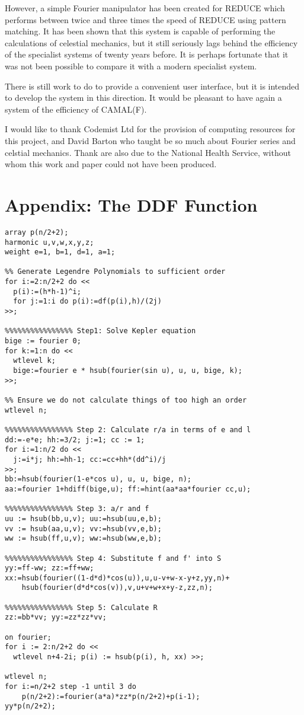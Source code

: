 However, a simple Fourier manipulator has been created for REDUCE which
performs between twice and three times the speed of REDUCE using
pattern matching.  It has been shown that this system is capable of
performing the calculations of celestial mechanics, but it still
seriously lags behind the efficiency of the specialist systems of
twenty years before.  It is perhaps fortunate that it was not been
possible to compare it with a modern specialist system.

There is still work to do to provide a convenient user interface, but
it is intended to develop the system in this direction.  It would be
pleasant to have again a system of the efficiency of CAMAL(F).

I would like to thank Codemist Ltd for the provision of computing
resources for this project, and David Barton who taught be so much
about Fourier series and celstial mechanics.  Thank are also due to
the National Health Service, without whom this work and paper could not
have been produced.

\section*{Appendix: The DDF Function}
\begin{verbatim}
array p(n/2+2);
harmonic u,v,w,x,y,z;
weight e=1, b=1, d=1, a=1;

%% Generate Legendre Polynomials to sufficient order
for i:=2:n/2+2 do <<
  p(i):=(h*h-1)^i;
  for j:=1:i do p(i):=df(p(i),h)/(2j)
>>;

%%%%%%%%%%%%%%%% Step1: Solve Kepler equation
bige := fourier 0;
for k:=1:n do <<
  wtlevel k;
  bige:=fourier e * hsub(fourier(sin u), u, u, bige, k);
>>;

%% Ensure we do not calculate things of too high an order
wtlevel n;

%%%%%%%%%%%%%%%% Step 2: Calculate r/a in terms of e and l
dd:=-e*e; hh:=3/2; j:=1; cc := 1;
for i:=1:n/2 do <<
  j:=i*j; hh:=hh-1; cc:=cc+hh*(dd^i)/j
>>;
bb:=hsub(fourier(1-e*cos u), u, u, bige, n);
aa:=fourier 1+hdiff(bige,u); ff:=hint(aa*aa*fourier cc,u);

%%%%%%%%%%%%%%%% Step 3: a/r and f
uu := hsub(bb,u,v); uu:=hsub(uu,e,b);
vv := hsub(aa,u,v); vv:=hsub(vv,e,b);
ww := hsub(ff,u,v); ww:=hsub(ww,e,b);

%%%%%%%%%%%%%%%% Step 4: Substitute f and f' into S
yy:=ff-ww; zz:=ff+ww;
xx:=hsub(fourier((1-d*d)*cos(u)),u,u-v+w-x-y+z,yy,n)+
    hsub(fourier(d*d*cos(v)),v,u+v+w+x+y-z,zz,n);

%%%%%%%%%%%%%%%% Step 5: Calculate R
zz:=bb*vv; yy:=zz*zz*vv;

on fourier;
for i := 2:n/2+2 do <<
  wtlevel n+4-2i; p(i) := hsub(p(i), h, xx) >>;

wtlevel n;
for i:=n/2+2 step -1 until 3 do
    p(n/2+2):=fourier(a*a)*zz*p(n/2+2)+p(i-1);
yy*p(n/2+2);

\end{verbatim}
\newpage




